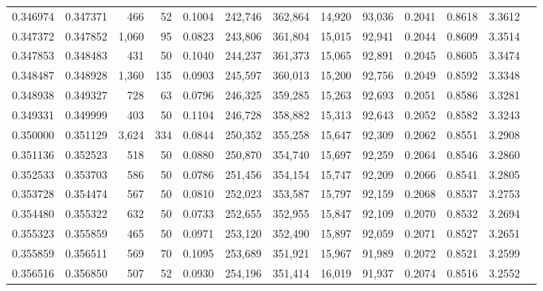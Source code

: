 \begin{tabular}{rrrrrrrrrrrrr}
0.346974 & 0.347371 &   466 &  52 &                                     0.1004 & 242,746 & 362,864 &  14,920 &  93,036 & 0.2041 & 0.8618 & 3.3612 \\
0.347372 & 0.347852 & 1,060 &  95 &                                     0.0823 & 243,806 & 361,804 &  15,015 &  92,941 & 0.2044 & 0.8609 & 3.3514 \\
0.347853 & 0.348483 &   431 &  50 &                                     0.1040 & 244,237 & 361,373 &  15,065 &  92,891 & 0.2045 & 0.8605 & 3.3474 \\
0.348487 & 0.348928 & 1,360 & 135 &                                     0.0903 & 245,597 & 360,013 &  15,200 &  92,756 & 0.2049 & 0.8592 & 3.3348 \\
0.348938 & 0.349327 &   728 &  63 &                                     0.0796 & 246,325 & 359,285 &  15,263 &  92,693 & 0.2051 & 0.8586 & 3.3281 \\
0.349331 & 0.349999 &   403 &  50 &                                     0.1104 & 246,728 & 358,882 &  15,313 &  92,643 & 0.2052 & 0.8582 & 3.3243 \\
0.350000 & 0.351129 & 3,624 & 334 &                                     0.0844 & 250,352 & 355,258 &  15,647 &  92,309 & 0.2062 & 0.8551 & 3.2908 \\
0.351136 & 0.352523 &   518 &  50 &                                     0.0880 & 250,870 & 354,740 &  15,697 &  92,259 & 0.2064 & 0.8546 & 3.2860 \\
0.352533 & 0.353703 &   586 &  50 &                                     0.0786 & 251,456 & 354,154 &  15,747 &  92,209 & 0.2066 & 0.8541 & 3.2805 \\
0.353728 & 0.354474 &   567 &  50 &                                     0.0810 & 252,023 & 353,587 &  15,797 &  92,159 & 0.2068 & 0.8537 & 3.2753 \\
0.354480 & 0.355322 &   632 &  50 &                                     0.0733 & 252,655 & 352,955 &  15,847 &  92,109 & 0.2070 & 0.8532 & 3.2694 \\
0.355323 & 0.355859 &   465 &  50 &                                     0.0971 & 253,120 & 352,490 &  15,897 &  92,059 & 0.2071 & 0.8527 & 3.2651 \\
0.355859 & 0.356511 &   569 &  70 &                                     0.1095 & 253,689 & 351,921 &  15,967 &  91,989 & 0.2072 & 0.8521 & 3.2599 \\
0.356516 & 0.356850 &   507 &  52 &                                     0.0930 & 254,196 & 351,414 &  16,019 &  91,937 & 0.2074 & 0.8516 & 3.2552 \\

\end{tabular}
